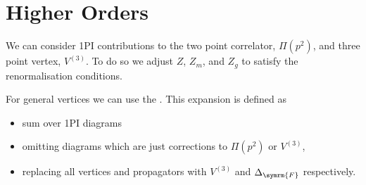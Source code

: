 \documentclass[fleqn]{NotesClass}
\newcommand{\feynman}{\symrm{F}}
\begin{document}
    \section{Higher Orders}
    We can consider 1PI contributions to the two point correlator, \(\Pi(p^2)\), and three point vertex, \(V^{(3)}\).
    To do so we adjust \(Z\), \(Z_m\), and \(Z_g\) to satisfy the renormalisation conditions.
    
    For general vertices we can use the .
    This expansion is defined as
    \begin{itemize}
        \item sum over 1PI diagrams
        \item omitting diagrams which are just corrections to \(\Pi(p^2)\) or \(V^{(3)}\),
        \item replacing all vertices and propagators with \(V^{(3)}\) and \(\Delta_{\feynman}\) respectively.
    \end{itemize}
    
\end{document}
